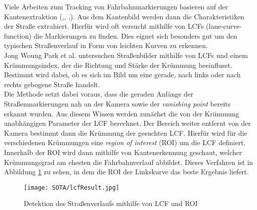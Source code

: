 Viele Arbeiten zum Tracking von Fahrbahnmarkierungen basieren auf der Kantenextraktion (\cite{Voisin2005},\cite{bai2010multiple}, \cite{Park20032301},\cite{wang2004lane}). Aus dem Kantenbild werden dann die Charakteristiken der Straße extrahiert.
Hierfür wird oft versucht mithilfe von LCFs (lane-curve-function) die Markierungen zu finden. Dies eignet sich besonders gut um den typischen Straßenverlauf in Form von leichten Kurven zu erkennen.\\
Jong Woung Park et al.\cite{Park20032301} untersuchen Straßenbilder mithilfe von LCFs und einem Krümmungsindex, der die Richtung und Stärke der Krümmung beeinflusst. Bestimmt wird dabei, ob es sich im Bild um eine gerade, nach links oder nach rechts gebogene Straße handelt.\\
Die Methode setzt dabei voraus, dass die geraden Anfänge der Straßenmarkierungen nah an der Kamera sowie der \textit{vanishing point} bereits erkannt wurden. Aus diesem Wissen werden zunächst die von der Krümmung unabhängigen Parameter der LCF berechnet. Der Bereich weiter entfernt von der Kamera bestimmt dann die Krümmung der gesuchten LCF. Hierfür wird für die verschiedenen Krümmungen eine \textit{region of interest} (ROI) um die LCF definiert. Innerhalb der ROI wird dann mithilfe von Kantenerkennung geschaut, welcher Krümmungsgrad am ehesten die Fahrbahnverlauf abbildet. Dieses Verfahren ist in Abbildung \ref{lcfDec} zu sehen, in dem die ROI der Linkskurve das beste Ergebnis liefert.
\begin{figure}[H]
	\centering
	\texttt{[image: SOTA/lcfResult.jpg]}
	\caption{Detektion des Straßenverlaufs mithilfe von LCF und ROI}
	\label{lcfDec}
\end{figure}

